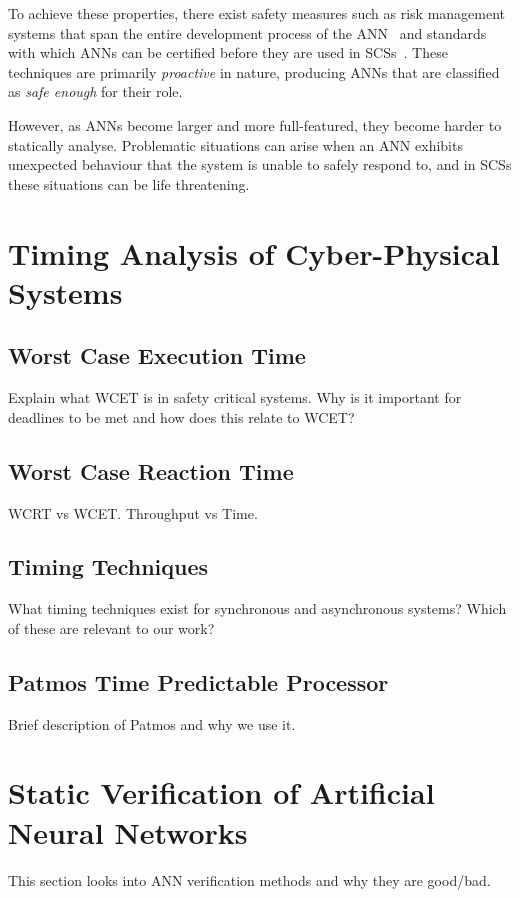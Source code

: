 To achieve these properties, there exist safety measures such as risk management systems that span the entire development process of the \ac{ANN}~\cite{ANNDevModel1999} and standards with which \acp{ANN} can be certified before they are used in \acp{SCS}~\cite{SCANNStandard}. 
These techniques are primarily \textit{proactive} in nature, producing \acp{ANN} that are classified as \textit{safe enough} for their role. 

However, as \acp{ANN} become larger and more full-featured, they  become harder to statically analyse.
Problematic situations can arise when an \ac{ANN} exhibits unexpected behaviour that the system is unable to safely respond to, and in \acp{SCS} these situations can be life threatening.







\section{Timing Analysis of Cyber-Physical Systems}
\subsection{Worst Case Execution Time}
Explain what WCET is in safety critical systems. Why is it important for deadlines to be met and how does this relate to WCET?

\subsection{Worst Case Reaction Time}
WCRT vs WCET. Throughput vs Time.

\subsection{Timing Techniques}
What timing techniques exist for synchronous and asynchronous systems? Which of these are relevant to our work?

\subsection{Patmos Time Predictable Processor}
Brief description of Patmos and why we use it.








\section{Static Verification of Artificial Neural Networks}
This section looks into ANN verification methods and why they are good/bad.

